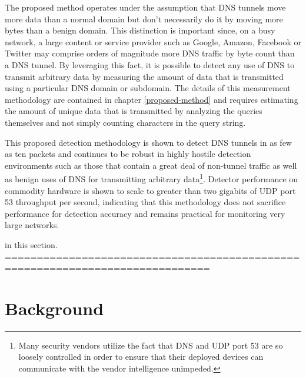 \documentclass[12pt]{report}
\theoremstyle{remark}
\theoremstyle{definition}
\theoremstyle{definition}
\theoremstyle{definition}
\begin{document}
The proposed method operates under the assumption that DNS tunnels move more
data than a normal domain but don't necessarily do it by moving more bytes than
a benign domain. This distinction is important since, on a busy network, a large
content or service provider such as Google, Amazon, Facebook or Twitter may
comprise orders of magnitude more DNS traffic by byte count than a DNS tunnel.
By leveraging this fact, it is possible to detect any use of DNS to transmit
arbitrary data by measuring the amount of data that is transmitted using a
particular DNS domain or subdomain. The details of this measurement methodology
are contained in chapter \ref{proposed-method} and requires estimating the
amount of unique data that is transmitted by analyzing the queries themselves
and not simply counting characters in the query string.

This proposed detection methodology is shown to detect DNS tunnels in as few as
ten packets and continues to be robust in highly hostile detection environments
such as those that contain a great deal of non-tunnel traffic as well as benign
uses of DNS for transmitting arbitrary data\footnote{Many security vendors
utilize the fact that DNS and UDP port 53 are so loosely controlled in order to
ensure that their deployed devices can communicate with the vendor intelligence
unimpeded.}. Detector performance on commodity hardware is shown to scale to
greater than two gigabits of UDP port 53 throughput per second, indicating that
this methodology does not sacrifice performance for detection accuracy and
remains practical for monitoring very large networks.

\newpage

in this section. %
==============================================================================
\chapter{Background}
\end{document}
